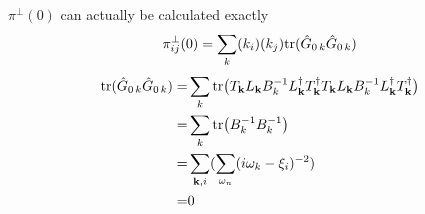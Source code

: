 $\pi^{\perp}(0)$ can actually be calculated   exactly
\begin{equation}
\pi_{ij}^{\perp}(0)=\sum_k(k_i)(k_j)\text{tr}(\hat{G}_{0\,k}\hat{G}_{0\,k})
\end{equation}
\begin{equation}
\begin{split}
	\text{tr}(\hat{G}_{0\,k}\hat{G}_{0\,k})=&\sum_k\text{tr}\big(T_{\mathbf{k}}L_{\mathbf{k}}B_{k}^{-1}L_{\mathbf{k}}^{\dagger}T_{\mathbf{k}}^{\dagger}T_{\mathbf{k}}L_{\mathbf{k}}B_{k}^{-1}L_{\mathbf{k}}^{\dagger}T_{\mathbf{k}}^{\dagger}\big)\\
	=&\sum_k\text{tr}\big(B_{k}^{-1}B_{k}^{-1}\big)\\
	=&\sum_{\mathbf{k},i}(\sum_{\omega_{n}}(i\omega_{k}-\xi_{i})^{-2})\\
	=&0
\end{split}
\end{equation}


